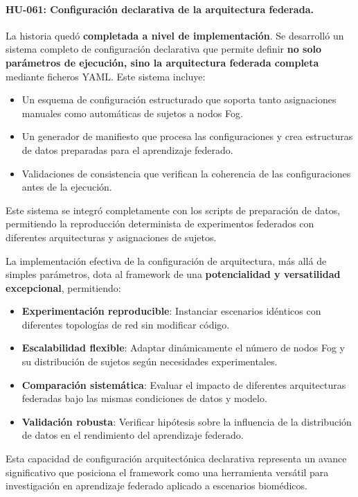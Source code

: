 \documentclass{report}
\begin{document}
\vspace{0.15em}
\paragraph{HU-061: Configuración declarativa de la arquitectura federada.}
La historia quedó \textbf{completada a nivel de implementación}. Se desarrolló un sistema completo de configuración declarativa que permite definir \textbf{no solo parámetros de ejecución, sino la arquitectura federada completa} mediante ficheros YAML. Este sistema incluye:
\begin{itemize}
    \item Un esquema de configuración estructurado que soporta tanto asignaciones manuales como automáticas de sujetos a nodos Fog.
    \item Un generador de manifiesto que procesa las configuraciones y crea estructuras de datos preparadas para el aprendizaje federado.
    \item Validaciones de consistencia que verifican la coherencia de las configuraciones antes de la ejecución.
\end{itemize}
Este sistema se integró completamente con los scripts de preparación de datos, permitiendo la reproducción determinista de experimentos federados con diferentes arquitecturas y asignaciones de sujetos.

La implementación efectiva de la configuración de arquitectura, más allá de simples parámetros, dota al framework de una \textbf{potencialidad y versatilidad excepcional}, permitiendo:
\begin{itemize}
    \item \textbf{Experimentación reproducible}: Instanciar escenarios idénticos con diferentes topologías de red sin modificar código.
    \item \textbf{Escalabilidad flexible}: Adaptar dinámicamente el número de nodos Fog y su distribución de sujetos según necesidades experimentales.
    \item \textbf{Comparación sistemática}: Evaluar el impacto de diferentes arquitecturas federadas bajo las mismas condiciones de datos y modelo.
    \item \textbf{Validación robusta}: Verificar hipótesis sobre la influencia de la distribución de datos en el rendimiento del aprendizaje federado.
\end{itemize}

Esta capacidad de configuración arquitectónica declarativa representa un avance significativo que posiciona el framework como una herramienta versátil para investigación en aprendizaje federado aplicado a escenarios biomédicos.
\end{document}
